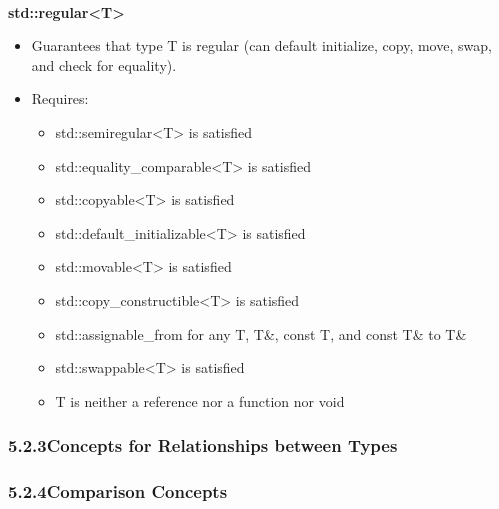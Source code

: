 \noindent
\hspace*{\fill} \\ %
\textbf{std::regular<T>}

\begin{itemize}
\item
Guarantees that type T is regular (can default initialize, copy, move, swap, and check for equality).

\item
Requires:
\begin{itemize}
\item
std::semiregular<T> is satisfied

\item
std::equality\_comparable<T> is satisfied

\item
std::copyable<T> is satisfied

\item
std::default\_initializable<T> is satisfied

\item
std::movable<T> is satisfied

\item
std::copy\_constructible<T> is satisfied

\item
std::assignable\_from for any T, T\&, const T, and const T\& to T\&

\item
std::swappable<T> is satisfied

\item
T is neither a reference nor a function nor void
\end{itemize}
\end{itemize}

\subsubsection*{ 5.2.3\hspace{0.2cm}Concepts for Relationships between Types}




\subsubsection*{ 5.2.4\hspace{0.2cm}Comparison Concepts}
